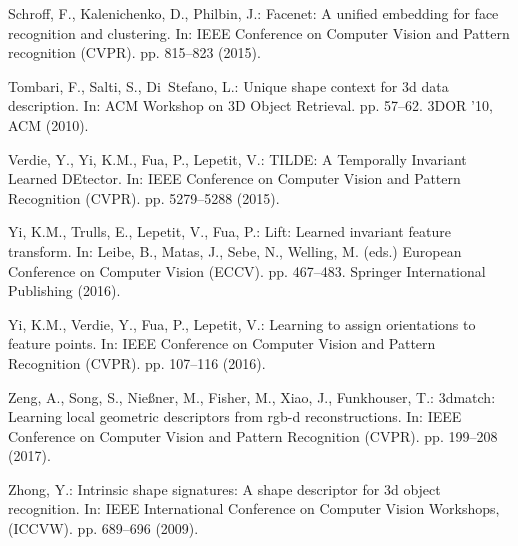 \documentclass[runningheads]{llncs}
\begin{document}
\begin{thebibliography}{10}
Schroff, F., Kalenichenko, D., Philbin, J.: Facenet: A unified embedding for
  face recognition and clustering. In: IEEE Conference on Computer Vision and
  Pattern recognition (CVPR). pp. 815--823 (2015).

Tombari, F., Salti, S., Di~Stefano, L.: Unique shape context for 3d data
  description. In: ACM Workshop on 3D Object Retrieval. pp. 57--62. 3DOR '10,
  ACM (2010). 

Verdie, Y., Yi, K.M., Fua, P., Lepetit, V.: {TILDE}: {A} {T}emporally
  {I}nvariant {L}earned {DE}tector. In: IEEE Conference on Computer Vision and
  Pattern Recognition (CVPR). pp. 5279--5288 (2015).

Yi, K.M., Trulls, E., Lepetit, V., Fua, P.: Lift: Learned invariant feature
  transform. In: Leibe, B., Matas, J., Sebe, N., Welling, M. (eds.) European
  Conference on Computer Vision (ECCV). pp. 467--483. Springer International
  Publishing (2016). 

Yi, K.M., Verdie, Y., Fua, P., Lepetit, V.: Learning to assign orientations to
  feature points. In: IEEE Conference on Computer Vision and Pattern
  Recognition (CVPR). pp. 107--116 (2016). 

Zeng, A., Song, S., Nie{\ss}ner, M., Fisher, M., Xiao, J., Funkhouser, T.:
  3dmatch: Learning local geometric descriptors from rgb-d reconstructions. In:
  IEEE Conference on Computer Vision and Pattern Recognition (CVPR). pp.
  199--208 (2017). 

Zhong, Y.: Intrinsic shape signatures: A shape descriptor for 3d object
  recognition. In: IEEE International Conference on Computer Vision Workshops,
  (ICCVW). pp. 689--696 (2009). 

\end{thebibliography}
 
\end{document}
